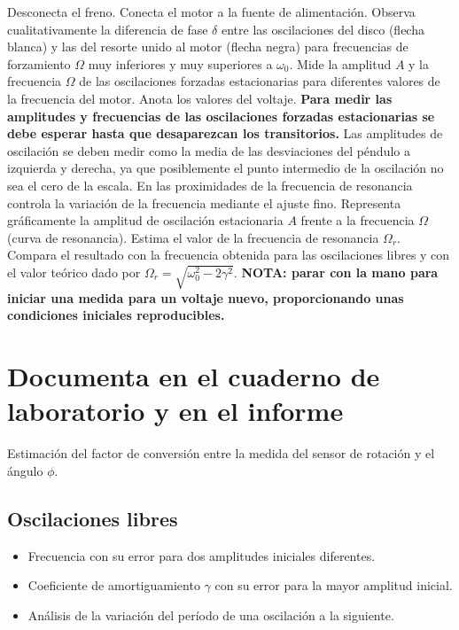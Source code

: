 \documentclass[11pt]{articulo}
\begin{document}
Desconecta el freno. Conecta el motor a la fuente de alimentaci\'on. Observa cualitativamente la diferencia de fase $\delta$ entre las oscilaciones del disco (flecha blanca) y las del resorte unido al motor (flecha negra) para frecuencias de forzamiento $\Omega$ muy inferiores y muy superiores a $\omega_0$. Mide la amplitud $A$ y la frecuencia $\Omega$ de las oscilaciones forzadas estacionarias para diferentes valores de la frecuencia del motor. Anota los valores del voltaje. {\bf Para medir las amplitudes y frecuencias de las oscilaciones forzadas estacionarias se debe esperar hasta que desaparezcan los transitorios.} Las amplitudes de oscilaci\'on se deben medir como la media de las desviaciones del p\'endulo a izquierda y derecha, ya que posiblemente el punto intermedio de la oscilaci\'on no sea el cero de la escala. En las proximidades de la frecuencia de resonancia controla la variaci\'on de la frecuencia mediante el ajuste fino. Representa gr\'aficamente la amplitud de oscilaci\'on estacionaria $A$ frente a la frecuencia $\Omega$ (curva de resonancia). Estima el valor de la frecuencia de resonancia $\Omega_r$. Compara el resultado con la frecuencia obtenida para las oscilaciones libres y con el valor te\'orico dado por $\Omega_r = \sqrt{\omega_0^2 - 2\gamma^2}$. {\bf NOTA: parar con la mano para iniciar una medida para un voltaje nuevo, proporcionando unas condiciones iniciales reproducibles.}


%


\newpage
\section*{Documenta en el cuaderno de laboratorio y en el informe}

Estimaci\'on del factor de conversi\'on entre la medida del sensor de rotaci\'on y el \'angulo $\phi$.

\subsection*{Oscilaciones libres}

\begin{itemize}

\item{Frecuencia con su error para dos amplitudes iniciales diferentes.}
\item{Coeficiente de amortiguamiento $\gamma$ con su error para la mayor amplitud inicial.}
\item{An\'alisis de la variaci\'on del per\'iodo de una oscilaci\'on a la siguiente.}

\end{itemize}
\end{document}
